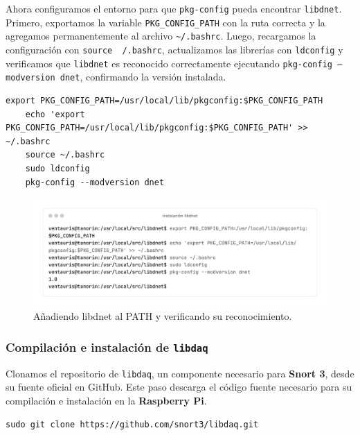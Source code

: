\documentclass[11pt,a4paper,twoside]{report}
\begin{document}
Ahora configuramos el entorno para que \texttt{pkg-config} pueda encontrar \texttt{libdnet}. Primero, exportamos la variable \texttt{PKG\_CONFIG\_PATH} con la ruta correcta y la agregamos permanentemente al archivo \texttt{\~{}/.bashrc}. Luego, recargamos la configuración con \texttt{source ~/.bashrc}, actualizamos las librerías con \texttt{ldconfig} y verificamos que \texttt{libdnet} es reconocido correctamente ejecutando \texttt{pkg-config --modversion dnet}, confirmando la versión instalada.

\begin{lstlisting}[style=commandstyle, caption={Añadiendo libdnet al PATH y verificando su reconocimiento}]
	export PKG_CONFIG_PATH=/usr/local/lib/pkgconfig:$PKG_CONFIG_PATH
	echo 'export PKG_CONFIG_PATH=/usr/local/lib/pkgconfig:$PKG_CONFIG_PATH' >> ~/.bashrc
	source ~/.bashrc
	sudo ldconfig
	pkg-config --modversion dnet
\end{lstlisting}

\begin{figure}[H]
	\centering
	\includegraphics[scale=0.12]{instalacion_snort/8-8.png}
	\caption{Añadiendo libdnet al PATH y verificando su reconocimiento.}
\end{figure}

\newpage

\subsubsection*{Compilación e instalación de \texttt{libdaq}}

Clonamos el repositorio de \texttt{libdaq}, un componente necesario para \textbf{Snort 3}, desde su fuente oficial en GitHub. Este paso descarga el código fuente necesario para su compilación e instalación en la \textbf{Raspberry Pi}.

\begin{lstlisting}[style=commandstyle, caption={Descargando libdaq desde el repositorio oficial}]
	sudo git clone https://github.com/snort3/libdaq.git
\end{lstlisting}
\end{document}
